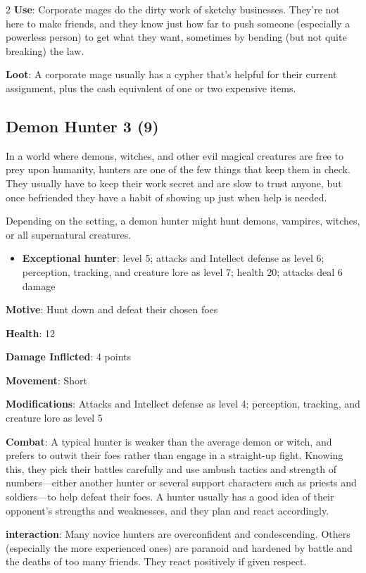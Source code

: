 \begin{multicols}{2}
\textbf{Use}: Corporate mages do the dirty work of sketchy businesses. They’re not here to make friends, and they know just how far to push someone (especially a powerless person) to get what they want, sometimes by bending (but not quite breaking) the law. 

\textbf{Loot}: A corporate mage usually has a cypher that’s helpful for their current assignment, plus the cash equivalent of one or two expensive items.

\subsection{Demon Hunter 3 (9)}

In a world where demons, witches, and other evil magical creatures are free to prey upon humanity, hunters are one of the few things that keep them in check. They usually have to keep their work secret and are slow to trust anyone, but once befriended they have a habit of showing up just when help is needed.

Depending on the setting, a demon hunter might hunt demons, vampires, witches, or all supernatural creatures. 

\begin{itemize}
\item \textbf{Exceptional hunter}: level 5; attacks and Intellect defense as level 6; perception, tracking, and creature lore as level 7; health 20; attacks deal 6 damage
\end{itemize}

\textbf{Motive}: Hunt down and defeat their chosen foes 

\textbf{Health}: 12 

\textbf{Damage Inflicted}: 4 points 

\textbf{Movement}: Short 

\textbf{Modifications}: Attacks and Intellect defense as level 4; perception, tracking, and creature lore as level 5 

\textbf{Combat}: A typical hunter is weaker than the average demon or witch, and prefers to outwit their foes rather than engage in a straight-up fight. Knowing this, they pick their battles carefully and use ambush tactics and strength of numbers—either another hunter or several support characters such as priests and soldiers—to help defeat their foes. A hunter usually has a good idea of their opponent’s strengths and weaknesses, and they plan and react accordingly. 

\textbf{interaction}: Many novice hunters are overconfident and condescending. Others (especially the more experienced ones) are paranoid and hardened by battle and the deaths of too many friends. They react positively if given respect. 


\end{multicols}
